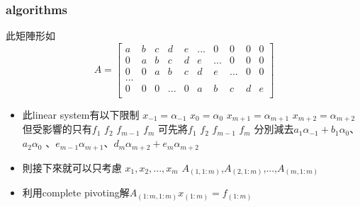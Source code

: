 \documentclass[12pt]{article}
\begin{document}
    \subsubsection*{algorithms}
        此矩陣形如\\
        \begin{equation*}
            A =
            \left[
                \begin{array}{ccccccccccc}
                    a&b&c&d&e&...&0&0&0&0\\
                    0&a&b&c&d&e&...&0&0&0\\
                    0&0&a&b&c&d&e&...&0&0\\
                    ... \\
                    0&0&0&...&0&a&b&c&d&e\\
                \end{array}
            \right]
        \end{equation*}
        \begin{itemize}
            \item 此linear system有以下限制
                \subitem $x_{-1}=\alpha_{-1}$
                \subitem $x_{0}=\alpha_{0}$ 
                \subitem $x_{m+1}=\alpha_{m+1}$
                \subitem $x_{m+2}=\alpha_{m+2}$\\
                \subitem 但受影響的只有$f_1$ $f_2$ $f_{m-1}$ $f_{m}$
                \subitem 可先將$f_1$ $f_2$ $f_{m-1}$ $f_{m}$
                \subitem 分別減去$a_1\alpha_{-1}+b_1\alpha_{0}$、$a_2\alpha_{0}$ 、$e_{m-1}\alpha_{m+1}$、$d_{m}\alpha_{m+2}+e_{m}\alpha_{m+2}$
            \item 則接下來就可以只考慮
                \subitem $x_1,x_2,...,x_m$
                \subitem $A_{(1,1:m)}$,$A_{(2,1:m)}$,...,$A_{(m,1:m)}$
            \item 利用complete pivoting解$A_{(1:m,1:m)}x_{(1:m)}=f_{(1:m)}$
        \end{itemize}
\end{document}
